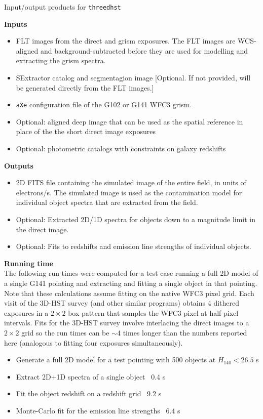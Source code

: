 \documentclass[preprint]{aastex}
\begin{document}
\centerline{Input/output products for \texttt{threedhst}}
\noindent \textbf{Inputs}
\begin{itemize}
\item  FLT images from the direct and grism exposures.  The FLT images are WCS-aligned and background-subtracted before they are used for modelling and extracting the grism spectra.
\item SExtractor catalog and segmentagion image [Optional.  If not provided, will be generated directly from the FLT images.]
\item \texttt{aXe} configuration file of the G102 or G141 WFC3 grism.
\item Optional: aligned deep image that can be used as the spatial reference in place of the the short direct image exposures
\item Optional: photometric catalogs with constraints on galaxy redshifts
\end{itemize}
\textbf{Outputs}
\begin{itemize}
\item 2D FITS file containing the simulated image of the entire field, in units of electrons/s.  The simulated image is used as the contamination model for individual object spectra that are extracted from the field.
\item Optional: Extracted 2D/1D spectra for objects down to a magnitude limit in the direct image.
\item Optional: Fits to redshifts and emission line strengths of individual objects.
\end{itemize}
\textbf{Running time} \\
The following run times were computed for a test case running a full 2D model of a single G141 pointing and extracting and fitting a single object in that pointing.  Note that these calculations assume fitting on the native WFC3 pixel grid.  Each visit of the 3D-HST survey (and other similar programs) obtains 4 dithered exposures in a $2\times2$ box pattern that samples the WFC3 pixel at half-pixel intervals.  Fits for the 3D-HST survey involve interlacing the direct images to a $2\times2$ grid so the run times can be $\sim$4 times longer than the numbers reported here (analogous to fitting four exposures simultaneously).
\begin{itemize}
\item Generate a full 2D model for a test pointing with 500 objects at $H_{140} < 26.5$  s
\item Extract 2D+1D spectra of a single object \dotfill\ 0.4 s
\item Fit the object redshift on a redshift grid \dotfill\ 9.2 s
\item Monte-Carlo fit for the emission line strengths \dotfill\ 6.4 s
\end{itemize}
\end{document}
